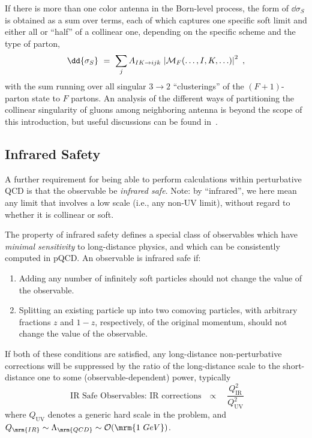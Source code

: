 If there is more than one color antenna in the Born-level process, the
form of $\dd{\sigma_S}$ is obtained as a sum over terms, each of which
captures one specific soft limit and either all or ``half'' of a
collinear one, depending on the specific scheme and the type of
parton,
\begin{equation}
\dd{\sigma_S} \ = \ \sum_{j} A_{IK\to ijk} \, 
\left\vert {\cal M}_F(\ldots,I,K,\ldots)\right\vert^2~,
\end{equation}
with the sum running over all  singular 
$3\to 2$ ``clusterings'' of the $(F+1)$-parton state to $F$
partons. An analysis of the different ways of partitioning the collinear
singularity of gluons among neighboring antenna is beyond the scope of
this introduction, but useful discussions can be found
in~\cite{Larkoski:2009ah,Giele:2011cb,LopezVillarejo:2011ap}. 

%
%
%
\subsection{Infrared Safety \label{sec:IRsafe}}
A further requirement for being able to perform calculations within
perturbative QCD is that the observable be \emph{infrared safe}. 
Note: by ``infrared'',
we here mean any  limit 
that involves a low scale (i.e., any non-UV limit), 
without regard to  whether it is collinear or soft.

The property of infrared safety defines a special class of observables which
have \emph{minimal sensitivity} 
to long-distance physics, and which can be consistently computed in
pQCD. 
An observable is infrared safe if:
\begin{enumerate}
\item {} Adding any number of infinitely soft particles should not change
  the value of the observable. 
\item {} Splitting an existing particle up into two comoving particles, with
arbitrary fractions $z$ and $1-z$, respectively, of 
the original momentum, should not change the value of the
observable. 
\end{enumerate}
If both of these conditions are satisfied, any long-distance non-perturbative
corrections will be suppressed by the ratio of the 
long-distance scale to the short-distance one to some
(observable-dependent) power, typically
%
\begin{equation}
\mbox{IR Safe Observables: IR corrections~~~$\propto$~~~} \frac{Q_{\mathrm{IR}}^2}{Q_{\mathrm{UV}}^2} 
\end{equation}
where $Q_\mathrm{UV}$ denotes
a generic hard scale in the problem, and $Q_\mrm{IR} \sim
\Lambda_\mrm{QCD} \sim \mathcal{O}(\mrm{1\ GeV})$. 

